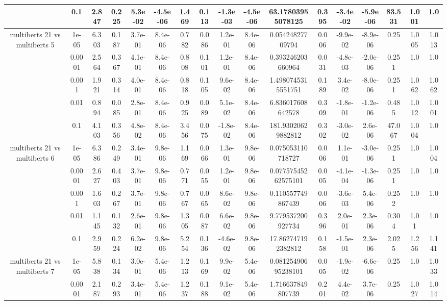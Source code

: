 \begin{tabular}{|c|c|c|c|c|c|c|c|c|c|c|c|c|c|c|c|c|}
 & 0.1 & 2.847 & 0.225 & 5.3e-02 & -4.5e-06 & 1.469 & 0.113 & -1.3e-03 & -4.5e-06 & 63.17803955078125 & 0.395 & -3.4e-02 & -5.9e-06 & 83.531 & 1.001 & 1.0 \\
\hline
\multirow{5}{*}{multiberts 21 vs multiberts 5} & 1e-05 & 6.303 & 0.187 & 3.7e-01 & 8.4e-06 & 0.782 & 0.086 & 1.2e-01 & 8.4e-06 & 0.05424827709794 & 0.006 & -9.9e-02 & -8.9e-06 & 0.25 & 1.005 & 1.013 \\
 & 0.0001 & 2.564 & 0.367 & 4.1e-01 & 8.4e-06 & 0.808 & 0.101 & 1.2e-01 & 8.4e-06 & 0.393246203660964 & 0.031 & -4.8e-03 & -2.0e-06 & 0.251 & 1.0 & 1.0 \\
 & 0.001 & 1.921 & 0.314 & 4.0e-01 & 8.4e-06 & 0.818 & 0.105 & 9.6e-02 & 8.4e-06 & 1.4980745315551751 & 0.189 & 3.4e-02 & -8.0e-06 & 0.251 & 1.062 & 1.062 \\
 & 0.01 & 0.894 & 0.085 & 2.8e-01 & 8.4e-06 & 0.925 & 0.089 & 5.1e-02 & 8.4e-06 & 6.836017608642578 & 0.309 & -1.8e-01 & -1.2e-06 & 0.485 & 1.012 & 1.001 \\
 & 0.1 & 4.103 & 0.356 & 4.8e-02 & 8.4e-06 & 3.456 & 0.075 & -1.8e-02 & 8.4e-06 & 181.93020629882812 & 0.302 & -3.0e-02 & 2.6e-06 & 47.067 & 1.004 & 1.0 \\
\hline
\multirow{5}{*}{multiberts 21 vs multiberts 6} & 1e-05 & 6.386 & 0.249 & 3.4e-01 & 9.8e-06 & 1.169 & 0.066 & 1.3e-01 & 9.8e-06 & 0.075053110718727 & 0.006 & 1.1e-01 & -3.0e-06 & 0.251 & 1.0 & 1.004 \\
 & 0.0001 & 2.627 & 0.403 & 3.7e-01 & 9.8e-06 & 0.771 & 0.055 & 1.2e-01 & 9.8e-06 & 0.07757545262575101 & 0.005 & -4.1e-04 & -1.3e-06 & 0.251 & 1.0 & 1.0 \\
 & 0.001 & 1.603 & 0.267 & 3.7e-01 & 9.8e-06 & 0.767 & 0.065 & 8.6e-02 & 9.8e-06 & 0.110557749867439 & 0.006 & -3.6e-03 & 5.4e-06 & 0.252 & 1.0 & 1.0 \\
 & 0.01 & 1.145 & 0.132 & 2.6e-01 & 9.8e-06 & 1.305 & 0.087 & 6.6e-02 & 9.8e-06 & 9.779537200927734 & 0.396 & 2.0e-01 & 2.3e-06 & 0.304 & 1.01 & 1.0 \\
 & 0.1 & 2.959 & 0.224 & 6.2e-02 & 9.8e-06 & 5.254 & 0.136 & -4.6e-02 & 9.8e-06 & 17.862747192382812 & 0.158 & -1.5e-01 & 2.3e-06 & 2.025 & 1.256 & 1.141 \\
\hline
\multirow{5}{*}{multiberts 21 vs multiberts 7} & 1e-05 & 5.838 & 0.134 & 3.0e-01 & 5.4e-06 & 1.213 & 0.169 & 9.9e-02 & 5.4e-06 & 0.08125490695238101 & 0.005 & -1.9e-02 & -6.6e-06 & 0.25 & 1.0 & 1.033 \\
 & 0.0001 & 2.187 & 0.293 & 3.4e-01 & 5.4e-06 & 1.237 & 0.188 & 9.1e-02 & 5.4e-06 & 1.716637849807739 & 0.201 & 4.4e-02 & 3.7e-06 & 0.25 & 1.027 & 1.014 \\

\end{tabular}
